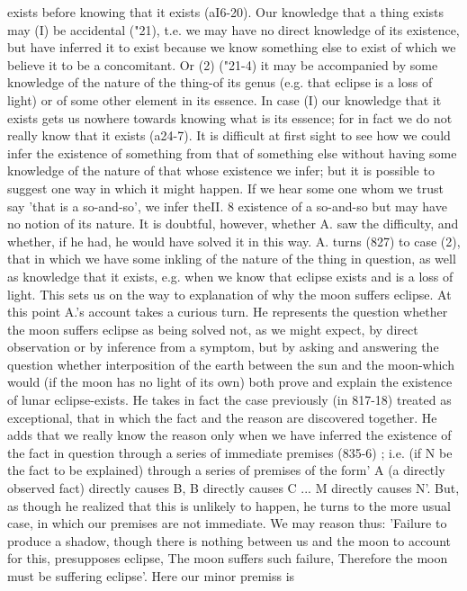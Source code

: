 {{{{{{{{{{{{{{{{{{{{{{{{{{{{{{{exists before knowing that it exists (aI6-20).
Our knowledge that a thing exists may (I) be accidental ("21),
t.e. we may have no direct knowledge of its existence, but have
inferred it to exist because we know something else to exist of
which we believe it to be a concomitant. Or (2) ("21-4) it may be
accompanied by some knowledge of the nature of the thing-of
its genus (e.g. that eclipse is a loss of light) or of some other
element in its essence. In case (I) our knowledge that it exists
gets us nowhere towards knowing what is its essence; for in fact
we do not really know that it exists (a24-7).
It is difficult at first sight to see how we could infer the existence
of something from that of something else without having some
knowledge of the nature of that whose existence we infer; but it
is possible to suggest one way in which it might happen. If we
hear some one whom we trust say 'that is a so-and-so', we infer theII. 8
existence of a so-and-so but may have no notion of its nature. It
is doubtful, however, whether A. saw the difficulty, and whether,
if he had, he would have solved it in this way.
A. turns (827) to case (2), that in which we have some inkling
of the nature of the thing in question, as well as knowledge that
it exists, e.g. when we know that eclipse exists and is a loss of
light. This sets us on the way to explanation of why the moon
suffers eclipse. At this point A.'s account takes a curious turn.
He represents the question whether the moon suffers eclipse as
being solved not, as we might expect, by direct observation or
by inference from a symptom, but by asking and answering the
question whether interposition of the earth between the sun and
the moon-which would (if the moon has no light of its own) both
prove and explain the existence of lunar eclipse-exists. He takes
in fact the case previously (in 817-18) treated as exceptional, that
in which the fact and the reason are discovered together. He adds
that we really know the reason only when we have inferred the
existence of the fact in question through a series of immediate
premises (835-6) ; i.e. (if N be the fact to be explained) through
a series of premises of the form' A (a directly observed fact)
directly causes B, B directly causes C ... M directly causes N'.
But, as though he realized that this is unlikely to happen, he
turns to the more usual case, in which our premises are not
immediate. We may reason thus: 'Failure to produce a shadow,
though there is nothing between us and the moon to account for
this, presupposes eclipse, The moon suffers such failure, Therefore
the moon must be suffering eclipse'. Here our minor premiss is
}}}}}}}}}}}}}}}}}}}}}}}}}}}}}}}
